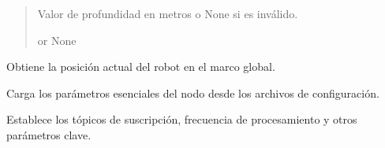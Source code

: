 \documentclass[a4paper,10pt,spanish]{sphinxmanual}
\begin{document}
\begin{fulllineitems}
\begin{fulllineitems}
\begin{quote}
\begin{description}
\sphinxAtStartPar
Valor de profundidad en metros o None si es inválido.

\sphinxAtStartPar
{} or None

\end{description}\end{quote}

\end{fulllineitems}


\begin{fulllineitems}
\label{\detokenize{squad_object_detection_action:squad_object_detection_action.TurtleBotObjectDetectionAction.get_robot_pose}}
\pysigstartsignatures
{}
\pysigstopsignatures
\sphinxAtStartPar
Obtiene la posición actual del robot en el marco global.

\end{fulllineitems}


\begin{fulllineitems}
\label{\detokenize{squad_object_detection_action:squad_object_detection_action.TurtleBotObjectDetectionAction.load_parameters}}
\pysigstartsignatures
{}
\pysigstopsignatures
\sphinxAtStartPar
Carga los parámetros esenciales del nodo desde los archivos de configuración.

\sphinxAtStartPar
Establece los tópicos de suscripción, frecuencia de procesamiento y otros parámetros clave.

\end{fulllineitems}



\end{fulllineitems}
\end{document}
